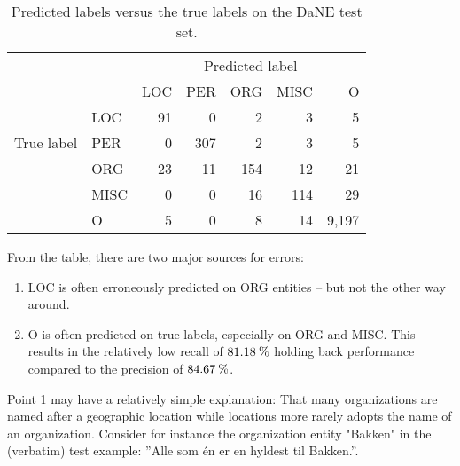 \documentclass[main.tex]{subfiles}
\begin{document}
\begin{table}[H]
    \centering
    \small
    \begin{tabular}{l l | r r r r r }
        & &	\multicolumn{5}{c}{Predicted label}	\\
        \multirow{5}{*}{True label} & & LOC & PER & ORG & MISC & O \\\hline
            & LOC  & 91 & 0    & 2   & 3   & 5   \\
            & PER  & 0  & 307  & 2   & 3   & 5   \\
            & ORG  & 23 & 11   & 154 & 12  & 21  \\
            & MISC & 0  & 0    & 16  & 114 & 29  \\
            & O    & 5  & 0    & 8   & 14  & 9,197
    \end{tabular}
    \caption{Predicted labels versus the true labels on the DaNE test set.}
    \label{tab:pred-true-confmat}
\end{table}\noindent
From the table, there are two major sources for errors:
\begin{enumerate}
    \item LOC is often erroneously predicted on ORG entities -- but not the other way around.
    \item O is often predicted on true labels, especially on ORG and MISC. This results in the relatively low recall of $81.18\:\text{\%{}}$ holding back performance compared to the precision of $84.67\:\text{\%{}}$.
\end{enumerate}
Point 1 may have a relatively simple explanation: 
That many organizations are named after a geographic location while locations more rarely adopts the name of an organization.
Consider for instance the organization entity "Bakken" in the (verbatim) test example: ''Alle som én er en hyldest til Bakken.''.
\end{document}
